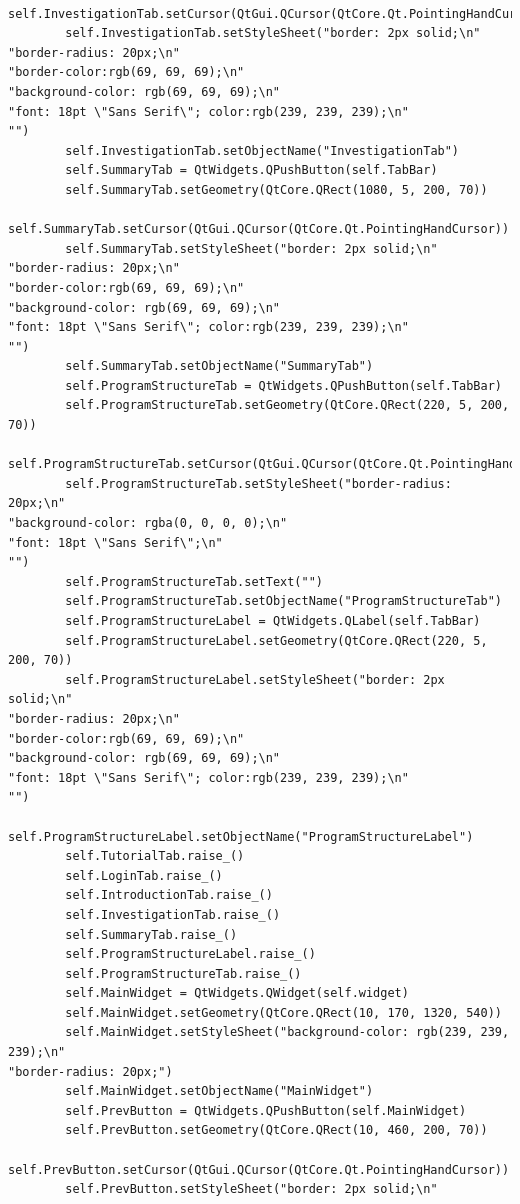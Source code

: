 \documentclass[12pt]{article}
\begin{document}
\begin{lstlisting}
        self.InvestigationTab.setCursor(QtGui.QCursor(QtCore.Qt.PointingHandCursor))
        self.InvestigationTab.setStyleSheet("border: 2px solid;\n"
"border-radius: 20px;\n"
"border-color:rgb(69, 69, 69);\n"
"background-color: rgb(69, 69, 69);\n"
"font: 18pt \"Sans Serif\"; color:rgb(239, 239, 239);\n"
"")
        self.InvestigationTab.setObjectName("InvestigationTab")
        self.SummaryTab = QtWidgets.QPushButton(self.TabBar)
        self.SummaryTab.setGeometry(QtCore.QRect(1080, 5, 200, 70))
        self.SummaryTab.setCursor(QtGui.QCursor(QtCore.Qt.PointingHandCursor))
        self.SummaryTab.setStyleSheet("border: 2px solid;\n"
"border-radius: 20px;\n"
"border-color:rgb(69, 69, 69);\n"
"background-color: rgb(69, 69, 69);\n"
"font: 18pt \"Sans Serif\"; color:rgb(239, 239, 239);\n"
"")
        self.SummaryTab.setObjectName("SummaryTab")
        self.ProgramStructureTab = QtWidgets.QPushButton(self.TabBar)
        self.ProgramStructureTab.setGeometry(QtCore.QRect(220, 5, 200, 70))
        self.ProgramStructureTab.setCursor(QtGui.QCursor(QtCore.Qt.PointingHandCursor))
        self.ProgramStructureTab.setStyleSheet("border-radius: 20px;\n"
"background-color: rgba(0, 0, 0, 0);\n"
"font: 18pt \"Sans Serif\";\n"
"")
        self.ProgramStructureTab.setText("")
        self.ProgramStructureTab.setObjectName("ProgramStructureTab")
        self.ProgramStructureLabel = QtWidgets.QLabel(self.TabBar)
        self.ProgramStructureLabel.setGeometry(QtCore.QRect(220, 5, 200, 70))
        self.ProgramStructureLabel.setStyleSheet("border: 2px solid;\n"
"border-radius: 20px;\n"
"border-color:rgb(69, 69, 69);\n"
"background-color: rgb(69, 69, 69);\n"
"font: 18pt \"Sans Serif\"; color:rgb(239, 239, 239);\n"
"")
        self.ProgramStructureLabel.setObjectName("ProgramStructureLabel")
        self.TutorialTab.raise_()
        self.LoginTab.raise_()
        self.IntroductionTab.raise_()
        self.InvestigationTab.raise_()
        self.SummaryTab.raise_()
        self.ProgramStructureLabel.raise_()
        self.ProgramStructureTab.raise_()
        self.MainWidget = QtWidgets.QWidget(self.widget)
        self.MainWidget.setGeometry(QtCore.QRect(10, 170, 1320, 540))
        self.MainWidget.setStyleSheet("background-color: rgb(239, 239, 239);\n"
"border-radius: 20px;")
        self.MainWidget.setObjectName("MainWidget")
        self.PrevButton = QtWidgets.QPushButton(self.MainWidget)
        self.PrevButton.setGeometry(QtCore.QRect(10, 460, 200, 70))
        self.PrevButton.setCursor(QtGui.QCursor(QtCore.Qt.PointingHandCursor))
        self.PrevButton.setStyleSheet("border: 2px solid;\n"

\end{lstlisting}
\end{document}
